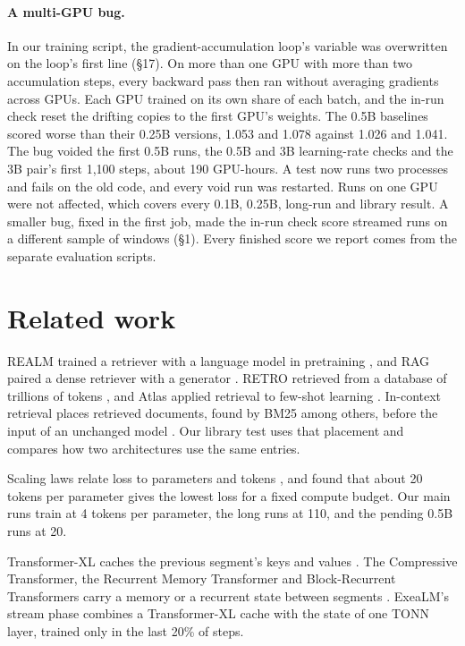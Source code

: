 \documentclass[10pt,twocolumn,letterpaper]{article}
\newcommand{\sect}[1]{\S#1}
\begin{document}
\paragraph{A multi-GPU bug.}
In our training script, the gradient-accumulation loop's variable was overwritten on the loop's first line (\sect{17}).
On more than one GPU with more than two accumulation steps, every backward pass then ran without averaging gradients across GPUs.
Each GPU trained on its own share of each batch, and the in-run check reset the drifting copies to the first GPU's weights.
The 0.5B baselines scored worse than their 0.25B versions, 1.053 and 1.078 against 1.026 and 1.041.
The bug voided the first 0.5B runs, the 0.5B and 3B learning-rate checks and the 3B pair's first 1,100 steps, about 190 GPU-hours.
A test now runs two processes and fails on the old code, and every void run was restarted.
Runs on one GPU were not affected, which covers every 0.1B, 0.25B, long-run and library result.
A smaller bug, fixed in the first job, made the in-run check score streamed runs on a different sample of windows (\sect{1}).
Every finished score we report comes from the separate evaluation scripts.

\section{Related work}
\label{sec:related}

REALM trained a retriever with a language model in pretraining \citep{guu2020realm}, and RAG paired a dense retriever with a generator \citep{lewis2020rag}.
RETRO retrieved from a database of trillions of tokens \citep{borgeaud2022retro}, and Atlas applied retrieval to few-shot learning \citep{izacard2023atlas}.
In-context retrieval places retrieved documents, found by BM25 among others, before the input of an unchanged model \citep{ram2023incontext}.
Our library test uses that placement and compares how two architectures use the same entries.

Scaling laws relate loss to parameters and tokens \citep{kaplan2020scaling}, and \citet{hoffmann2022chinchilla} found that about 20 tokens per parameter gives the lowest loss for a fixed compute budget.
Our main runs train at 4 tokens per parameter, the long runs at 110, and the pending 0.5B runs at 20.

Transformer-XL caches the previous segment's keys and values \citep{dai2019transformerxl}.
The Compressive Transformer, the Recurrent Memory Transformer and Block-Recurrent Transformers carry a memory or a recurrent state between segments \citep{rae2020compressive,bulatov2022rmt,hutchins2022block}.
ExeaLM's stream phase combines a Transformer-XL cache with the state of one TONN layer, trained only in the last 20\% of steps.
\end{document}
